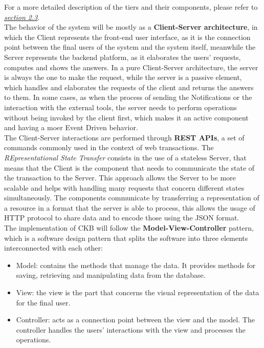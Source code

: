 For a more detailed description of the tiers and their components, please refer to \hyperref[sec:deployment_view]{\textit{section 2.3}}.\\
The behavior of the system will be mostly as a \textbf{Client-Server architecture}, in which the Client represents the front-end user interface, as it is the connection point between the final users of the system and the system itself, meanwhile the Server represents the backend platform, as it elaborates the users’ requests, computes and shows the answers. In a pure Client-Server architecture, the server is always the one to make the request, while the server is a passive element, which handles and elaborates the requests of the client and returns the answers to them. In some cases, as when the process of sending the Notifications or the interaction with the external tools, the server needs to perform operations without being invoked by the client first, which makes it an active component and having a moer Event Driven behavior.
\\
The Client-Server interactions are performed through \textbf{REST APIs}, a set of commands commonly used in the context of web transactions. The \textit{REpresentational State Transfer} consists in the use of a stateless Server, that means that the Client is the component that needs to communicate the state of the transaction to the Server. This approach allows the Server to be more scalable and helps with handling many requests that concern different states simultaneously. The components communicate by transferring a representation of a resource in a format that the server is able to process, this allows the usage of HTTP protocol to share data and to encode those using the JSON format.
\\
The implementation of CKB will follow the \textbf{Model-View-Controller} pattern, which is a software design pattern that splits the software into three elements interconnected with each other: 
\begin{itemize}
    \item Model: contains the methods that manage the data. It provides methods for saving, retrieving and manipulating data from the database.
    \item View: the view is the part that concerns the visual representation of the data for the final user.
    \item Controller: acts as a connection point between the view and the model. The controller handles the users’ interactions with the view and processes the operations.
\end{itemize}

